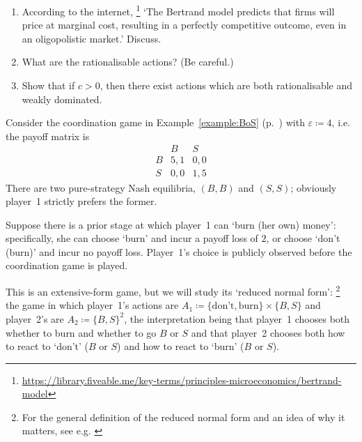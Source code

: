 \begin{exercise}
\begin{enumerate}[label=(\alph*),resume]
		\item According to the internet,%
			\footnote{\url{https://library.fiveable.me/key-terms/principles-microeconomics/bertrand-model}}
		`The Bertrand model predicts that firms will price at marginal cost, resulting in a perfectly competitive outcome, even in an oligopolistic market.' Discuss.

		\item What are the rationalisable actions? (Be careful.)

		\item Show that if $c>0$, then there exist actions which are both rationalisable and weakly dominated.

	\end{enumerate}
\end{exercise}

\begin{exercise}
	\label{exercise:benporathdekel}
	Consider the coordination game in Example~\ref*{example:BoS} (p.~\pageref*{example:BoS}) with $\varepsilon \coloneqq 4$, i.e. the payoff matrix is
	\begin{equation*}
		\begin{array}{c|cc}
			  & B   & S \\ \hline
			B & 5,1 & 0,0 \\
			S & 0,0 & 1,5 
		\end{array}
	\end{equation*}
	There are two pure-strategy Nash equilibria, $(B,B)$ and $(S,S)$; obviously player~1 strictly prefers the former.

	Suppose there is a prior stage at which player~1 can `burn (her own) money': specifically, she can choose `burn' and incur a payoff loss of $2$, or choose `don't (burn)' and incur no payoff loss. Player~1's choice is publicly observed before the coordination game is played.

	This is an extensive-form game, but we will study its `reduced normal form':%
		\footnote{For the general definition of the reduced normal form and an idea of why it matters, see e.g. \textcite[section~2.4]{Myerson1991}}
	the game in which player~1's actions are $A_1 \coloneqq \{\text{don't},\text{burn}\} \times \{B,S\}$ and player~2's are $A_2 \coloneqq \{B,S\}^2$, the interpretation being that player~1 chooses both whether to burn and whether to go $B$ or $S$ and that player~2 chooses both how to react to `don't' ($B$ or $S$) and how to react to `burn' ($B$ or $S$).

	\begin{enumerate}[label=(\alph*)]


\end{enumerate}
\end{exercise}
